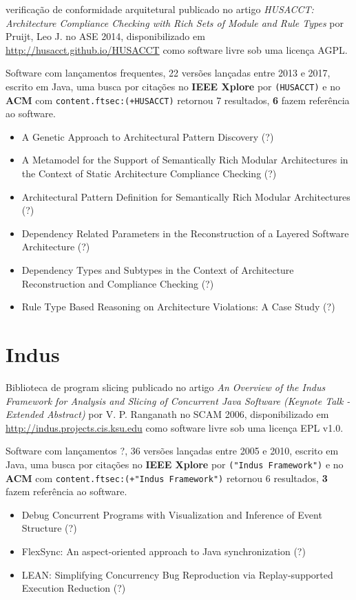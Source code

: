 verificação de conformidade arquitetural
publicado no artigo {\it HUSACCT: Architecture Compliance Checking with Rich Sets of Module and Rule Types}
por Pruijt, Leo J.
no ASE 2014,
disponibilizado em \url{http://husacct.github.io/HUSACCT}
como software livre
sob uma licença AGPL.

Software com lançamentos frequentes,
22 versões lançadas
entre 2013 e 2017,
escrito em Java,
uma busca por citações no {\bf IEEE Xplore} por
\texttt{(HUSACCT)}
e no {\bf ACM} com
\texttt{content.ftsec:(+HUSACCT)}
retornou
7 resultados,
{\bf 6} fazem referência ao software.

\begin{itemize}
\item A Genetic Approach to Architectural Pattern Discovery (?)
\item A Metamodel for the Support of Semantically Rich Modular Architectures in the Context of Static Architecture Compliance Checking (?)
\item Architectural Pattern Definition for Semantically Rich Modular Architectures (?)
\item Dependency Related Parameters in the Reconstruction of a Layered Software Architecture (?)
\item Dependency Types and Subtypes in the Context of Architecture Reconstruction and Compliance Checking (?)
\item Rule Type Based Reasoning on Architecture Violations: A Case Study (?)
\end{itemize}

\section{Indus}

Biblioteca de program slicing
publicado no artigo {\it An Overview of the Indus Framework for Analysis and Slicing of Concurrent Java Software (Keynote Talk - Extended Abstract)}
por V. P. Ranganath
no SCAM 2006,
disponibilizado em \url{http://indus.projects.cis.ksu.edu}
como software livre
sob uma licença EPL v1.0.

Software com lançamentos ?,
36 versões lançadas
entre 2005 e 2010,
escrito em Java,
uma busca por citações no {\bf IEEE Xplore} por
\texttt{("Indus Framework")}
e no {\bf ACM} com
\texttt{content.ftsec:(+"Indus Framework")}
retornou
6 resultados,
{\bf 3} fazem referência ao software.

\begin{itemize}
\item Debug Concurrent Programs with Visualization and Inference of Event Structure (?)
\item FlexSync: An aspect-oriented approach to Java synchronization (?)
\item LEAN: Simplifying Concurrency Bug Reproduction via Replay-supported Execution Reduction (?)
\end{itemize}

